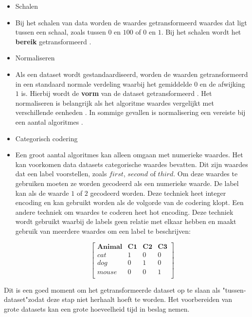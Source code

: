 \begin{itemize}
  \item Schalen
  \item[] Bij het schalen van data worden de waardes getransformeerd waardes dat ligt tussen een schaal, zoals tussen \(0\) en \(100\) of \(0\) en \(1\). Bij het schalen wordt het \textbf{bereik} getransformeerd \cite{scale-and-normalize-data}. 
  \item Normaliseren
  \item[] Als een dataset wordt gestandaardiseerd, worden de waarden getransformeerd in een standaard normale verdeling waarbij het gemiddelde \(0\) en de afwijking \(1\) is. Hierbij wordt de \textbf{vorm} van de dataset getransformeerd \cite{scale-and-normalize-data}. Het normaliseren is belangrijk als het algoritme waardes vergelijkt met verschillende eenheden \cite{feature-scaling-standardization}. In sommige gevallen is normalisering een vereiste bij een aantal algoritmes \cite{data-transformation-standardization-vs-normalization}.
  \item Categorisch codering
  \item[] Een groot aantal algoritmes kan alleen omgaan met numerieke waardes. Het kan voorkomen data datasets categorische waardes bevatten. Dit zijn waardes dat een label voorstellen, zoals \(first\), \(second\) of \(third\). Om deze waardes te gebruiken moeten ze worden gecodeerd als een numerieke waarde. De label kan als de waarde \(1\) of \(2\) gecodeerd worden. Deze techniek heet integer encoding en kan gebruikt worden als de volgorde van de codering klopt. Een andere techniek om waardes te coderen heet hot encoding. Deze techniek wordt gebruikt waarbij de labels geen relatie met elkaar hebben en maakt gebruik van meerdere waardes om een label te beschrijven:
  \begin{center}
    $$\begin{bmatrix}
      \textbf{Animal} & \textbf{C1} & \textbf{C2} & \textbf{C3}\\
      cat & 1 & 0 & 0 \\
      dog & 0 & 1 & 0 \\
      mouse & 0 & 0 & 1 \\
    \end{bmatrix}$$
  \end{center}


\end{itemize}

Dit is een goed moment om het getransformeerde dataset op te slaan als "tussen-dataset"\space zodat deze stap niet herhaalt hoeft te worden. Het voorbereiden van grote datasets kan een grote hoeveelheid tijd in beslag nemen.

